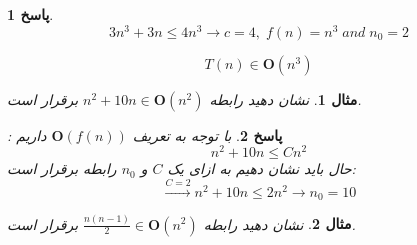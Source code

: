 \documentclass[12pt]{article}
\newtheorem{question}{مثال}[section]
\newtheorem{answer}{پاسخ}[section]
\begin{document}
\begin{answer}
\[
3n^3 + 3n \le 4n^3 \rightarrow c = 4 ,\; f(n) = n^3 \; and \; n_0 = 2
\]

\[T(n) \in \mathbf{O}(n^3)\]
\end{answer}

\begin{question}
	نشان دهید رابطه $ n^2 + 10n \in \mathbf{O}(n^2) $ برقرار است.
\end{question}

\begin{answer}
با توجه به تعریف $\mathbf{O}(f(n))$ داریم :
\[
n^2 + 10n \le Cn^2
\]
حال باید  نشان دهیم به ازای یک $C$ و $n_0$ رابطه برقرار است:
\[
\xrightarrow{C=2} n^2 + 10n \le 2n^2 \rightarrow n_0 = 10
\]
\end{answer}

\begin{question}
نشان دهید رابطه $\frac{n(n-1)}{2} \in \mathbf{O}(n^2)$ برقرار است.
\end{question}
\end{document}
